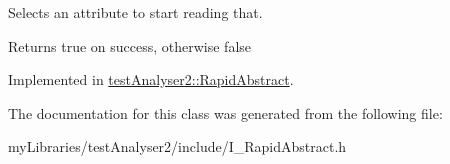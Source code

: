 Selects an attribute to start reading that. 

\begin{DoxyReturn}{Returns}
true on success, otherwise false 
\end{DoxyReturn}


Implemented in \mbox{\hyperlink{classtestAnalyser2_1_1RapidAbstract_a5ca627c1c860c9f5ff58cb6bf612fe81}{test\+Analyser2\+::\+Rapid\+Abstract}}.



The documentation for this class was generated from the following file\+:\begin{DoxyCompactItemize}
\item 
my\+Libraries/test\+Analyser2/include/I\+\_\+\+Rapid\+Abstract.\+h\end{DoxyCompactItemize}
